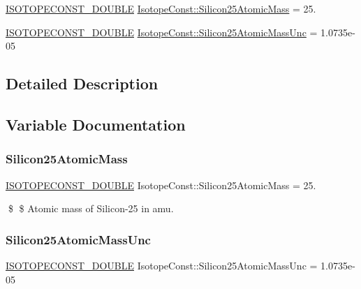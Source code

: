 \begin{DoxyCompactItemize}
\item 
\mbox{\hyperlink{group___isotope_const-_macros_ga8f45a7272ce02c0b4c65c44636ed719a}{I\+S\+O\+T\+O\+P\+E\+C\+O\+N\+S\+T\+\_\+\+D\+O\+U\+B\+LE}} \mbox{\hyperlink{group___isotope_const-_silicon-_si25_ga5e5cc47997d16b17e6ca076906c734d9}{Isotope\+Const\+::\+Silicon25\+Atomic\+Mass}} = 25.
\item 
\mbox{\hyperlink{group___isotope_const-_macros_ga8f45a7272ce02c0b4c65c44636ed719a}{I\+S\+O\+T\+O\+P\+E\+C\+O\+N\+S\+T\+\_\+\+D\+O\+U\+B\+LE}} \mbox{\hyperlink{group___isotope_const-_silicon-_si25_ga27ec9740abbfb9afe808e12808591765}{Isotope\+Const\+::\+Silicon25\+Atomic\+Mass\+Unc}} = 1.\+0735e-\/05
\end{DoxyCompactItemize}


\subsection{Detailed Description}


\subsection{Variable Documentation}
\mbox{\label{group___isotope_const-_silicon-_si25_ga5e5cc47997d16b17e6ca076906c734d9}} 
\subsubsection{\texorpdfstring{Silicon25\+Atomic\+Mass}{Silicon25AtomicMass}}
{\footnotesize\ttfamily \mbox{\hyperlink{group___isotope_const-_macros_ga8f45a7272ce02c0b4c65c44636ed719a}{I\+S\+O\+T\+O\+P\+E\+C\+O\+N\+S\+T\+\_\+\+D\+O\+U\+B\+LE}} Isotope\+Const\+::\+Silicon25\+Atomic\+Mass = 25.}

\$ \$ Atomic mass of Silicon-\/25 in amu. \mbox{\label{group___isotope_const-_silicon-_si25_ga27ec9740abbfb9afe808e12808591765}} 
\subsubsection{\texorpdfstring{Silicon25\+Atomic\+Mass\+Unc}{Silicon25AtomicMassUnc}}
{\footnotesize\ttfamily \mbox{\hyperlink{group___isotope_const-_macros_ga8f45a7272ce02c0b4c65c44636ed719a}{I\+S\+O\+T\+O\+P\+E\+C\+O\+N\+S\+T\+\_\+\+D\+O\+U\+B\+LE}} Isotope\+Const\+::\+Silicon25\+Atomic\+Mass\+Unc = 1.\+0735e-\/05}

